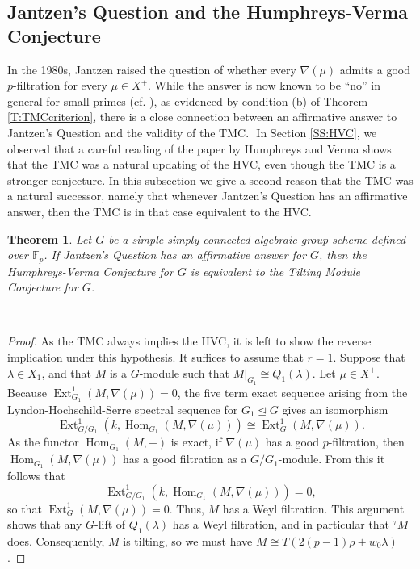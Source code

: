 \documentclass[twoside,11pt,reqno]{amsart}
\newcommand{\Hom}{\ensuremath{\operatorname{Hom}}}
\newcommand{\Ext}{\operatorname{Ext}}
\newcommand{\0}{\bar 0}
\newcommand{\1}{\bar 1}
\newtheorem{theorem}{Theorem}[subsection]
\theoremstyle{definition}
\numberwithin{equation}{subsection}
\begin{document}
\subsection{Jantzen's Question and the Humphreys-Verma Conjecture} In the 1980s, Jantzen raised the question of whether every $\nabla(\mu)$ admits a good $p$-filtration for every $\mu \in X^+$.    While the answer is now known to be ``no'' in general for small primes (cf. \cite{BNPS20, BNPS22b}), as evidenced by condition (b) of Theorem \ref{T:TMCcriterion}, there is a close connection between an affirmative answer to Jantzen's Question and the validity of the TMC.  
﻿
In Section \ref{SS:HVC}, we observed that a careful reading of the paper by Humphreys and Verma \cite{HV73} shows that the TMC was a natural updating of the HVC, even though the TMC is a stronger conjecture.  In this subsection we give a second reason that the TMC was a natural successor, namely that whenever Jantzen's Question has an affirmative answer, then the TMC is in that case equivalent to the HVC.
﻿
\begin{theorem}
Let $G$ be a simple simply connected algebraic group scheme defined over ${\mathbb F}_{p}$.  If Jantzen's Question has an affirmative answer for $G$, then the Humphreys-Verma Conjecture for $G$ is equivalent to the Tilting Module Conjecture for $G$.
\end{theorem}
﻿
\begin{proof}
As the TMC always implies the HVC, it is left to show the reverse implication under this hypothesis.  It suffices to assume that $r=1$.  
﻿
Suppose that $\lambda \in X_1$, and that $M$ is a $G$-module such that $M|_{G_1} \cong Q_1(\lambda)$.  Let $\mu \in X^+$.  Because $\Ext_{G_1}^1(M,\nabla(\mu))=0$, the five term exact sequence arising from the Lyndon-Hochschild-Serre spectral sequence for $G_1 \unlhd G$ gives an isomorphism
\[
\Ext_{G/G_1}^1(k,\Hom_{G_1}(M,\nabla(\mu))) \cong \Ext_G^1(M,\nabla(\mu)).
\]
As the functor $\Hom_{G_1}(M,-)$ is exact, if $\nabla(\mu)$ has a good $p$-filtration, then $\Hom_{G_1}(M,\nabla(\mu))$ has a good filtration as a $G/G_1$-module.  From this it follows that
\[
\Ext_{G/G_1}^1(k,\Hom_{G_1}(M,\nabla(\mu))) = 0,
\]
so that  $\Ext_G^1(M,\nabla(\mu)) = 0$.  Thus, $M$ has a Weyl filtration.  This argument shows that any $G$-lift of $Q_1(\lambda)$ has a Weyl filtration, and in particular that ${^{\tau}M}$ does.  Consequently,  $M$ is tilting, so we must have $M \cong T(2(p-1)\rho+w_0\lambda)$.
\end{proof}
﻿
﻿
\end{document}
